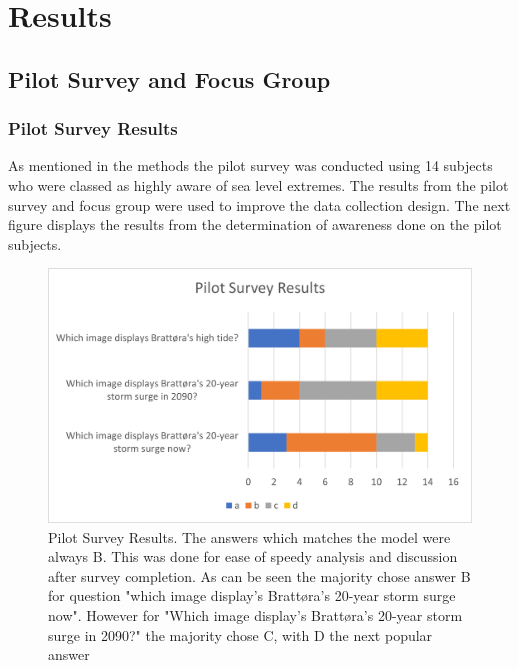 \chapter{Results}

\section{Pilot Survey and Focus Group}

\subsection{Pilot Survey Results}
As mentioned in the methods the pilot survey was conducted using 14 subjects who were classed as highly aware of sea level extremes. The results from the pilot survey and focus group were used to improve the data collection design. The next figure displays the results from the determination of awareness done on the pilot subjects.

\begin{figure}[h!]
    \centering
    \includegraphics{fig_results/pilot-survey-results.png}
    \caption{Pilot Survey Results. The answers which matches the model \cite{kartverket_se_2021} were always B. This was done for ease of speedy analysis and discussion after survey completion. As can be seen the majority chose answer B for question "which image display's Brattøra's 20-year storm surge now". However for "Which image display's Brattøra's 20-year storm surge in 2090?" the majority chose C, with D the next popular answer   }
    \label{fig:pilot_survey_results}
\end{figure}

